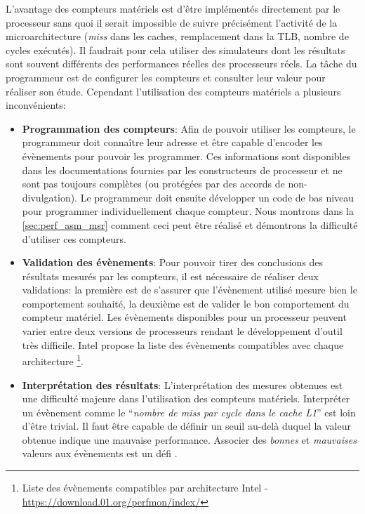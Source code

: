         L'avantage des compteurs matériels est d'être implémentés directement par le processeur sans quoi il serait impossible de suivre précisément l'activité de la microarchitecture (\textit{miss} dans les caches, remplacement dans la TLB, nombre de cycles exécutés). Il faudrait pour cela utiliser des simulateurs dont les résultats sont souvent différents des performances réelles des processeurs réels. La tâche du programmeur est de configurer les compteurs et consulter leur valeur pour réaliser son étude. Cependant l'utilisation des compteurs matériels a plusieurs inconvénients:
        \begin{itemize}
        
            \item \textbf{Programmation des compteurs}: Afin de pouvoir utiliser les compteurs, le programmeur doit connaître leur adresse et être capable d'encoder les évènements pour pouvoir les programmer. Ces informations sont disponibles dans les documentations fournies par les constructeurs de processeur et ne sont pas toujours complètes (ou protégées par des accords de non-divulgation). Le programmeur doit ensuite développer un code de bas niveau pour programmer individuellement chaque compteur. Nous montrons dans la \autoref{sec:perf_asm_msr} comment ceci peut être réalisé et démontrons la difficulté d'utiliser ces compteurs.
            
            \item \textbf{Validation des évènements}: Pour pouvoir tirer des conclusions des résultats mesurés par les compteurs, il est nécessaire de réaliser deux validations: la première est de s'assurer que l'évènement utilisé mesure bien le comportement souhaité, la deuxième est de valider le bon comportement du compteur matériel. Les évènements disponibles pour un processeur peuvent varier entre deux versions de processeurs rendant le développement d'outil très difficile. Intel propose la liste des évènements compatibles avec chaque architecture \footnote{Liste des évènements compatibles par architecture Intel - \url{https://download.01.org/perfmon/index/}}.
            
            \item \textbf{Interprétation des résultats}: L'interprétation des mesures obtenues est une difficulté majeure dans l'utilisation des compteurs matériels. Interpréter un évènement comme le ``\textit{nombre de miss par cycle dans le cache L1}'' est loin d'être trivial. Il faut être capable de définir un seuil au-delà duquel la valeur obtenue indique une mauvaise performance. Associer des \textit{bonnes} et \textit{mauvaises} valeurs aux évènements est un défi \cite{Moseley2011}.
            
        \end{itemize}
        
